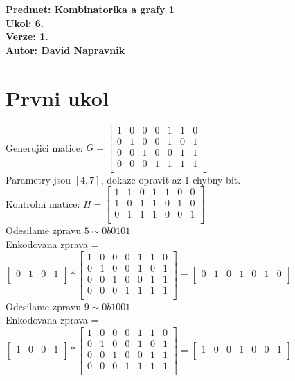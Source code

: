 \documentclass[a4paper]{article}
\begin{document}
\noindent
\textbf{Predmet: Kombinatorika a grafy 1}\\
\textbf{Ukol: 6.}\\
\textbf{Verze: 1.}\\
\textbf{Autor: David Napravnik}

\section*{Prvni ukol}
Generujici matice: $ G = 
\begin{bmatrix}
	1 & 0 & 0 & 0 & 1 & 1 & 0\\
	0 & 1 & 0 & 0 & 1 & 0 & 1\\
	0 & 0 & 1 & 0 & 0 & 1 & 1\\
	0 & 0 & 0 & 1 & 1 & 1 & 1\\
\end{bmatrix}
$\\
Parametry jsou $[4,7]$, dokaze opravit az 1 chybny bit.\\
Kontrolni matice: $ H = 
\begin{bmatrix}
	1 & 1 & 0 & 1 & 1 & 0 & 0\\
	1 & 0 & 1 & 1 & 0 & 1 & 0\\
	0 & 1 & 1 & 1 & 0 & 0 & 1\\
\end{bmatrix}
$\\
Odesilame zpravu $5 \sim 0b0101$\\
Enkodovana zprava = $
\begin{bmatrix}
	0 & 1 & 0 & 1\\
\end{bmatrix}
*
\begin{bmatrix}
	1 & 0 & 0 & 0 & 1 & 1 & 0\\
	0 & 1 & 0 & 0 & 1 & 0 & 1\\
	0 & 0 & 1 & 0 & 0 & 1 & 1\\
	0 & 0 & 0 & 1 & 1 & 1 & 1\\
\end{bmatrix}
=
\begin{bmatrix}
	0 & 1 & 0 & 1 & 0 & 1 & 0\\
\end{bmatrix}
$\\
Odesilame zpravu $9 \sim 0b1001$\\
Enkodovana zprava = $
\begin{bmatrix}
	1 & 0 & 0 & 1\\
\end{bmatrix}
*
\begin{bmatrix}
	1 & 0 & 0 & 0 & 1 & 1 & 0\\
	0 & 1 & 0 & 0 & 1 & 0 & 1\\
	0 & 0 & 1 & 0 & 0 & 1 & 1\\
	0 & 0 & 0 & 1 & 1 & 1 & 1\\
\end{bmatrix}
=
\begin{bmatrix}
	1 & 0 & 0 & 1 & 0 & 0 & 1\\
\end{bmatrix}
$\\
\end{document}
